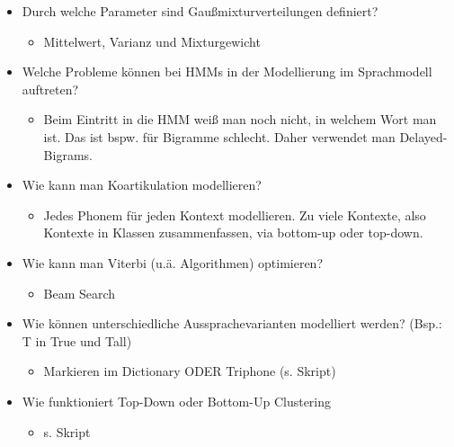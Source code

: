 \begin{itemize}
\begin{itemize}
\end{itemize}
\item Durch welche Parameter sind Gaußmixturverteilungen definiert? 
\begin{itemize}
\item Mittelwert, Varianz und Mixturgewicht
\end{itemize}
\item Welche Probleme können bei HMMs in der Modellierung im Sprachmodell auftreten? 
\begin{itemize}
\item Beim Eintritt in die HMM weiß man noch nicht, in welchem Wort man ist. Das ist bspw. für Bigramme schlecht. Daher verwendet man Delayed-Bigrams.
\end{itemize}
\item Wie kann man Koartikulation modellieren? 
\begin{itemize}
\item Jedes Phonem für jeden Kontext modellieren. Zu viele Kontexte, also Kontexte in Klassen zusammenfassen, via bottom-up oder top-down.
\end{itemize}
\item Wie kann man Viterbi (u.ä. Algorithmen) optimieren? 
\begin{itemize}
\item Beam Search
\end{itemize}
\item Wie können unterschiedliche Aussprachevarianten modelliert werden? (Bsp.: T in True und Tall)
\begin{itemize}
\item Markieren im Dictionary ODER Triphone (s. Skript)
\end{itemize}
\item Wie funktioniert Top-Down oder Bottom-Up Clustering 
\begin{itemize}
\item s. Skript
\end{itemize}
\end{itemize}


